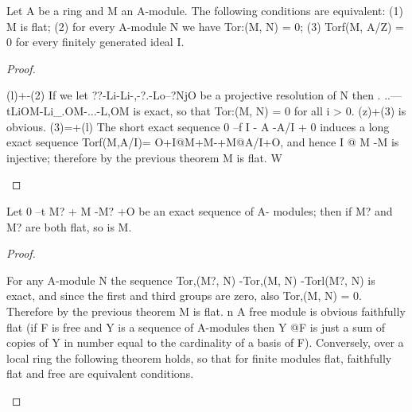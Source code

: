 \begin{theorem}[Theorem 7.8]\label{mcrt-auto-theorem-7-8}\uses{}
\begin{mathematicalrecord}
Let A be a ring and M an A-module. The following
conditions are equivalent:
  (1) M is flat;
  (2) for every A-module N we have Tor:(M, N) = 0;
  (3) Torf(M, A/Z) = 0 for every finitely generated ideal I.
\end{mathematicalrecord}
\end{theorem}
\begin{proof}
\begin{mathematicalrecord}
(l)+-(2)   If we let ??-Li-Li-,-?.-Lo--?NjO
be a projective resolution of N then
         . ..---tLiOM-Li_.OM-...-L,OM
is exact, so that Tor:(M, N) = 0 for all i > 0.
   (z)+(3) is obvious.
   (3)=+(l) The short exact sequence 0 --f I -        A -A/I     + 0 induces a
long exact sequence
           Torf(M,A/I)=   O+I@M+M-+M@A/I+O,
and hence I @ M -M         is injective; therefore by the previous theorem M
is flat. W
\end{mathematicalrecord}
\end{proof}


\begin{theorem}[Theorem 7.9]\label{mcrt-auto-theorem-7-9}\uses{}
\begin{mathematicalrecord}
Let 0 --t M? + M -M?            +O be an exact sequence of A-
modules; then if M? and M? are both flat, so is M.
\end{mathematicalrecord}
\end{theorem}
\begin{proof}
\begin{mathematicalrecord}
For any A-module N the sequence Tor,(M?, N) -Tor,(M,                     N)
 -Torl(M?,      N) is exact, and since the first and third groups are zero,
also Tor,(M, N) = 0. Therefore by the previous theorem M is flat. n
    A free module is obvious faithfully flat (if F is free and Y is a sequence of
A-modules then Y @F is just a sum of copies of Y in number equal to the
cardinality of a basis of F). Conversely, over a local ring the following
theorem holds, so that for finite modules flat, faithfully flat and free are
equivalent conditions.
\end{mathematicalrecord}
\end{proof}


